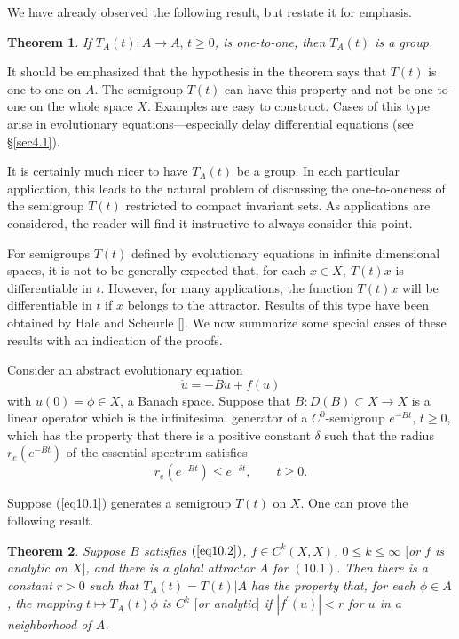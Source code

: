 \documentclass{surv-l}
\theoremstyle{plain}
\newtheorem{theorem}{Theorem}[section]
\theoremstyle{definition}
\numberwithin{equation}{section}
\numberwithin{figure}{chapter}
\begin{document}
We have already observed the following result, but restate it for emphasis.

\begin{theorem}\label{thm3.10.1} If $T_{A}(t)\!:A\rightarrow A,\, t\geq 0$, is one-to-one, then $T_{A}(t)$ is a group.
\end{theorem}

It should be emphasized that the hypothesis in the theorem says that $T(t)$ is one-to-one on $A$. The semigroup $T(t)$ can have this property and not be one-to-one on the whole space $X$. Examples are easy to construct. Cases of this type arise in evolutionary equations---especially delay differential equations (see \S\ref{sec4.1}).

It is certainly much nicer to have $T_{A}(t)$ be a group. In each particular application, this leads to the natural problem of discussing the one-to-oneness of the semigroup $T(t)$ restricted to compact invariant sets. As applications are considered, the reader will find it instructive to always consider this point.

For semigroups $T(t)$ defined by evolutionary equations in infinite dimensional spaces, it is not to be generally expected that, for each $x\in X,\ T(t)x$ is differentiable in $t$. However, for many applications, the function $T(t)x$ will be differentiable in $t$ if $x$ belongs to the attractor. Results of this type have been obtained by Hale and Scheurle [\citeyear{1985hs}]. We now summarize some special cases of these results with an indication of the proofs.

Consider an abstract evolutionary equation
\begin{equation}\label{eq10.1}
\dot{u}=-Bu+f(u)
\end{equation}
with $u(0)=\phi \in X$, a Banach space. Suppose that $B\!:D(B)\subset X\rightarrow X$ is a linear operator which is the infinitesimal generator of a $C^{0}$-semigroup $e^{-Bt},\, t\geq 0$, which has the property that there is a positive constant $\delta$ such that the radius $r_{e}(e^{-Bt})$ of the essential spectrum satisfies
\begin{equation}\label{eq10.2}
r_{e}(e^{-Bt})\leq e^{-\delta t},\qquad t\geq 0.
\end{equation}

Suppose (\ref{eq10.1}) generates a semigroup $T(t)$ on $X$. One can prove the following result.

\begin{theorem}\label{thm3.10.2} Suppose $B$ satisfies $(\ref{eq10.2})$, $f\in C^{k}(X, X)$, $0\leq k\leq\infty$ $[$or $f$ is analytic on $X]$, and there is a global attractor $A$ for $(10.1)$. Then there is a constant $r>0$ such that $T_{A}(t)=T(t) | A$ has the property that, for each $\phi \in A$, the mapping $t\mapsto T_{A}(t)\phi$ is $C^{k}$ $[$or analytic$]$ if $|f^{\prime}(u)|<r$ for $u$ in a neighborhood of $A$.
\end{theorem}
\end{document}
